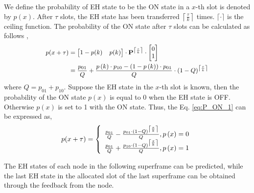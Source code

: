\documentclass[journal,10pt]{IEEEtran}
\begin{document}
We define the probability of EH state to be the ON state in a $x$-th slot is denoted by $p(x)$. After $\tau$ slots, the EH state has been transferred ${\left\lceil\frac{\tau}{k}\right\rceil}$ times. ${\lceil \cdot \rceil}$ is the ceiling function.
The probability of the ON state after $\tau$ slots can be calculated as follows \cite{tselishchev2011reducing},
\begin{equation} \footnotesize \label{eq:P_ON_1}
\begin{split}
p(x+\tau) &= \left[\begin{matrix}
		1 - p(k) & p(k)
  \end{matrix}\right] 
	\cdot \textbf{P}^{\left\lceil\frac{\tau}{k}\right\rceil} \cdot
	\left[\begin{matrix}
		0\\
		1
  \end{matrix}\right]  \\
  &= {{{p_{01}}} \over Q}+ {{p\left( k \right) \cdot {p_{10}} - \left( {{\rm{1}} - p\left( k \right)} \right) \cdot {p_{01}}} \over Q} \cdot {\left( {1 - Q} \right)^{\left\lceil {{\tau  \over k}} \right\rceil }}
\end{split}
\end{equation} 
where $Q = {p_{01}} + {p_{10}}$. Suppose the EH state in the $x$-th slot is known, then the probability of the ON state $p(x)$ is equal to 0 when the EH state is OFF. Otherwise $p(x)$ is set to 1 with the ON state. Thus, the Eq. \eqref{eq:P_ON_1} can be expressed as,
\begin{equation} \label{eq:P_ON_2}
p(x+\tau) =\left\{ { \begin{array}{l}
{{{{{p_{01}}} \over Q} - {{{p_{01}}\cdot{{\left( {1 - Q} \right)}^{\left\lceil\frac{\tau}{k}\right\rceil} }} \over Q},{\rm{  }}p\left( {x } \right) = 0}}\\
{{{{{p_{01}}} \over Q} + {{{p_{10}}\cdot{{\left( {1 - Q} \right)}^{\left\lceil\frac{\tau}{k}\right\rceil} }} \over Q},{\rm{  }}p\left( {x } \right) = 1}}
\end{array}}\right.
\end{equation}

The EH states of each node in the following superframe can be predicted, while the last EH state in the allocated slot of the last superframe can be obtained through the feedback from the node.
\end{document}
